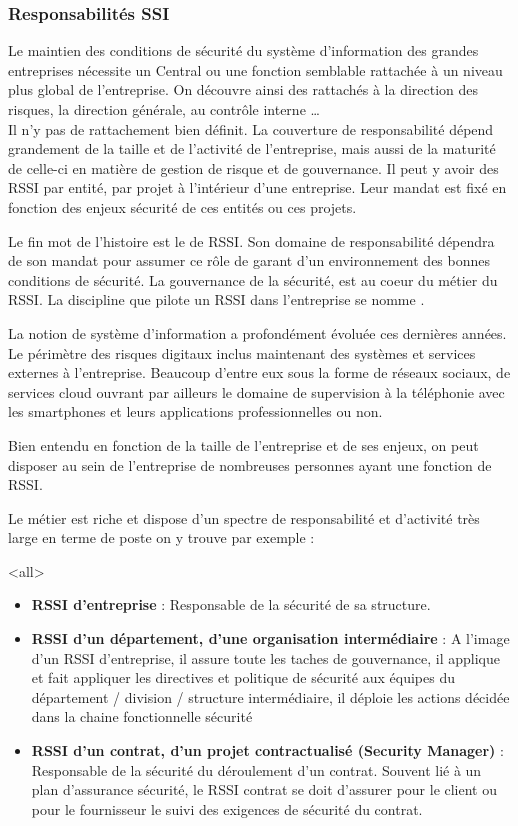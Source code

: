 \subsubsection{Responsabilités SSI}

Le maintien des conditions de sécurité du système d'information des grandes entreprises nécessite un  Central ou une fonction semblable rattachée à un niveau plus global de l'entreprise.
On découvre ainsi des   rattachés à la direction des risques, la direction générale, au contrôle interne …\\
 Il n'y pas de rattachement bien définit. La couverture de responsabilité dépend grandement de la taille et de l'activité de l'entreprise, mais aussi de la maturité de celle-ci en matière de gestion de risque et de gouvernance. Il peut y avoir des RSSI par entité, par projet à l’intérieur d'une entreprise. Leur mandat est fixé en fonction des enjeux sécurité de ces entités ou ces projets. 

Le fin mot de l'histoire est le  de RSSI. Son domaine de responsabilité dépendra de son mandat pour assumer ce rôle de garant d'un environnement  des bonnes conditions de sécurité.
La gouvernance de la sécurité, est au coeur du métier du RSSI. La discipline que pilote un RSSI dans l’entreprise se nomme .

La notion de système d'information a profondément évoluée ces dernières années. Le périmètre des risques digitaux inclus maintenant des systèmes et services externes à l'entreprise. Beaucoup d'entre eux sous la forme de réseaux sociaux, de services cloud ouvrant par ailleurs le domaine de supervision à la téléphonie avec les smartphones et leurs applications professionnelles ou non.

Bien entendu en fonction de la taille de l'entreprise et de ses enjeux, on peut disposer au sein de l'entreprise de nombreuses personnes ayant une fonction de RSSI. 

Le métier est riche et dispose d'un spectre de responsabilité et d'activité très large en terme de poste on y trouve par exemple :

\mode<all>{ 
{
\begin{itemize}
\item \textbf{RSSI d'entreprise} : Responsable de la sécurité de sa structure.
\item  \textbf{RSSI d'un département, d'une organisation intermédiaire} : A l'image d'un RSSI d'entreprise, il assure toute les taches de gouvernance, il applique et fait appliquer les directives et politique de sécurité aux équipes du département / division / structure intermédiaire, il déploie les actions décidée dans la chaine fonctionnelle sécurité
\item   \textbf{RSSI d'un contrat, d'un projet contractualisé (Security Manager)} : Responsable de la sécurité du  déroulement d'un contrat. Souvent lié à un plan d'assurance sécurité, le RSSI contrat se doit d'assurer pour le client ou pour le fournisseur le suivi des exigences de sécurité du contrat.
\end{itemize}
}} %


